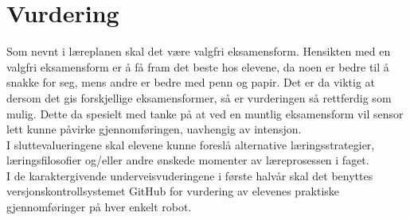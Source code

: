 \section{Vurdering} \label{Sec: Vurdering}

Som nevnt i læreplanen skal det være valgfri eksamensform. Hensikten med en valgfri eksamensform er å få fram det beste hos elevene, da noen er bedre til å snakke for seg, mens andre er bedre med penn og papir.
Det er da viktig at dersom det gis forskjellige eksamensformer, så er vurderingen så rettferdig som mulig. Dette da spesielt med tanke på at ved en muntlig eksamensform vil sensor lett kunne påvirke gjennomføringen, uavhengig av intensjon. \\

I sluttevalueringene skal elevene kunne foreslå alternative læringsstrategier, læringsfilosofier og/eller andre ønskede momenter av læreprosessen i faget.\\

I de karaktergivende underveisvuderingene i første halvår skal det benyttes versjonskontrollsystemet GitHub for vurdering av elevenes praktiske gjennomføringer på hver enkelt robot.

